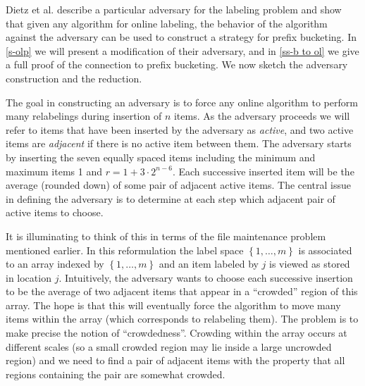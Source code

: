 \documentclass[unicode,review]{siamart1116}
\newcommand{\natInt}[2]{ \left\{ #1, \dotsc, #2 \right\} }
\numberwithin{theorem}{section}
\begin{document}
Dietz et al. \cite{DSZ04} describe a particular adversary
for the labeling problem and  show that given any algorithm for online labeling, the behavior of the algorithm
against the adversary can be used to construct a strategy for prefix bucketing.   In \cref{s-olp} we will present a
 modification of their adversary, 
and in \cref{ss-b to ol} we give a full proof of the
connection to prefix bucketing.  We now sketch the adversary construction and the reduction.
\iffalse
 If one can show that the cost of the derived bucketing strategy is no more than a constant times  the cost paid by the algorithm for relabelings then a lower bound on bucketing
will give a similar lower bound on the cost of any online labeling algorithm.  Unfortunately, their proof sketch does not show this.
In particular, a single relabeling step may correspond to a bucketing step whose cost is $\Omega(\log n))$, and this
undermines the reduction.
This may happen when inserting $\Theta(\log n)$ items into an empty segment of size $n^\epsilon$ without triggering any relabelings.
We construct a different adversary for which one gets the needed correspondence
between relabeling cost and bucketing steps.
\fi

The goal in constructing an adversary is to force any online algorithm to perform many relabelings during insertion of $n$ items.
As the adversary proceeds we will refer to items that have been inserted by the adversary as  
{\em active}, and two active items are {\em adjacent} if there is no active item between them. 
The adversary starts by inserting the seven equally spaced items including the minimum and maximum items 1 and $r=1+3\cdot 2^{n-6}$. 
Each successive inserted item will be  the average (rounded down) of some pair of adjacent
active items.   The central issue in defining the adversary is to determine at each step which
adjacent  pair of active items to choose. 

It is illuminating to think of this in terms of the file maintenance problem mentioned earlier.
In this reformulation the label space $\natInt{1}{m}$ is associated to an array indexed by $\natInt{1}{m}$
and an item  labeled by $j$ is viewed as stored in location $j$.
Intuitively, the adversary wants to choose each successive insertion to be the
average of two adjacent items that appear in a ``crowded'' region of this array.  The hope is that this will
eventually force the algorithm to move many items within the array (which corresponds to relabeling them).
The problem is to make precise the notion of ``crowdedness''.
Crowding within the array occurs at different scales (so a small crowded region may lie inside a large uncrowded region)
and we need to find a pair of adjacent items with the property that all regions containing the pair are somewhat crowded.
\end{document}
